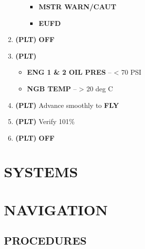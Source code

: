 \documentclass[fontHelvetica]{TechCheck}
\begin{document}
\begin{enumerate}[leftmargin=0.1\linewidth,rightmargin=0.1\linewidth, itemsep=4pt]
\begin{enumerate}[itemsep=4pt]
\begin{itemize}[itemsep=4pt]
				\item \textbf{MSTR WARN/CAUT}
				\item \textbf{EUFD}
			\end{itemize}
		\end{enumerate}
		\item {} \textbf{(PLT)} \dotfill \textbf{OFF} 
		\item {} \textbf{(PLT)}
		\begin{itemize}[itemsep=4pt]
			\item \textbf{ENG 1 \& 2 OIL PRES} -- < 70 PSI
			\item \textbf{NGB TEMP} -- > 20 deg C
		\end{itemize}
		\item {} \textbf{(PLT)} \dotfill Advance smoothly to \textbf{FLY} 
		\item {} \textbf{(PLT)} \dotfill Verify 101\% 
		\item {} \textbf{(PLT)} \dotfill \textbf{OFF}
	\end{enumerate}

	\cleardoublepage 

	\chapter{SYSTEMS}
	\minitoc
	\cleardoublepage

	\chapter{NAVIGATION}
	\minitoc
	\cleardoublepage

	\section{PROCEDURES}
\end{document}
